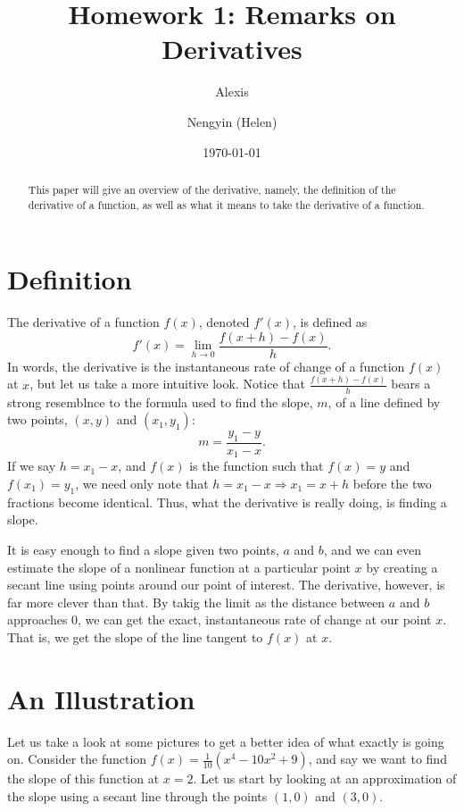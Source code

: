 \documentclass[aps,pra,notitlepage,amsmath,amssymb,letterpaper,12pt]{revtex4-1}
\begin{document}
 
\title{Homework 1: Remarks on Derivatives}
\author{Alexis }
\author{Nengyin (Helen) }
\date{\today}

\begin{abstract}
	This paper will give an overview of the derivative, namely, the definition of the derivative of a function, as well as what it means to take the derivative of a function. 
\end{abstract}

\maketitle

\section{Definition}
The derivative of a function $f(x)$, denoted $f'(x)$, is defined as
\begin{equation}
f'(x)=\lim_{h\rightarrow0}\frac{f(x+h)-f(x)}{h}.
\end{equation}
In words, the derivative is the instantaneous rate of change of a function $f(x)$ at $x$, but let us take a more intuitive look. Notice that $\frac{f(x+h)-f(x)}{h}$ bears a strong resemblnce to the formula used to find the slope, $m$, of a line defined by two points, $(x, y)$ and $(x_1,y_1)$:
\begin{equation}
m=\frac{y_1-y}{x_1-x}.
\end{equation}
If we say $h=x_1-x$, and $f(x)$ is the function such that $f(x)=y$ and $f(x_1)=y_1$, we need only note that $h=x_1-x\Rightarrow x_1=x+h$ before the two fractions become identical. Thus, what the derivative is really doing, is finding a slope. 

It is easy enough to find a slope given two points, $a$ and $b$, and we can even estimate the slope of a nonlinear function at a particular point $x$ by creating a secant line using points around our point of interest. The derivative, however, is far more clever than that. By takig the limit as the distance between $a$ and $b$ approaches $0$, we can get the exact, instantaneous rate of change at our point $x$. That is, we get the slope of the line tangent to $f(x)$ at $x$.

\section{An Illustration}
Let us take a look at some pictures to get a better idea of what exactly is going on. Consider the function $f(x)=\frac{1}{10}(x^4-10x^2+9)$, and say we want to find the slope of this function at $x=2$. Let us start by looking at an approximation of the slope using a secant line through the points $(1,0)$ and $(3,0)$.
\end{document}
